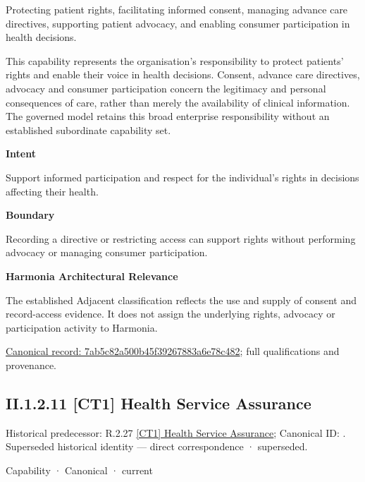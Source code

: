 Protecting patient rights, facilitating informed consent, managing advance care directives, supporting patient advocacy, and enabling consumer participation in health decisions.



This capability represents the organisation's responsibility to protect patients' rights and enable their voice in health decisions. Consent, advance care directives, advocacy and consumer participation concern the legitimacy and personal consequences of care, rather than merely the availability of clinical information. The governed model retains this broad enterprise responsibility without an established subordinate capability set.



\textbf{Intent}



Support informed participation and respect for the individual's rights in decisions affecting their health.



\textbf{Boundary}



Recording a directive or restricting access can support rights without performing advocacy or managing consumer participation.



\textbf{Harmonia Architectural Relevance}



The established Adjacent classification reflects the use and supply of consent and record-access evidence. It does not assign the underlying rights, advocacy or participation activity to Harmonia.


{\footnotesize \href{../../../../../../../continuum/strategy/capability/7ab5c82a500b45f39267883a6e78c482.md}{Canonical record: 7ab5c82a500b45f39267883a6e78c482}; full qualifications and provenance.}\par
\subsection*{II.1.2.11 [CT1] Health Service Assurance}
\label{navigation:II.1.2.11}

{\small Historical predecessor: R.2.27 \hyperref[element:6a82dc1423374e809dbf542eeaa69482]{[CT1] Health Service Assurance}; Canonical ID: \texttt{}. Superseded historical identity — direct correspondence · superseded.}\par
\label{element:14860102964c441681d41ec3da423fe0}
{\small Capability · Canonical · current}\par

